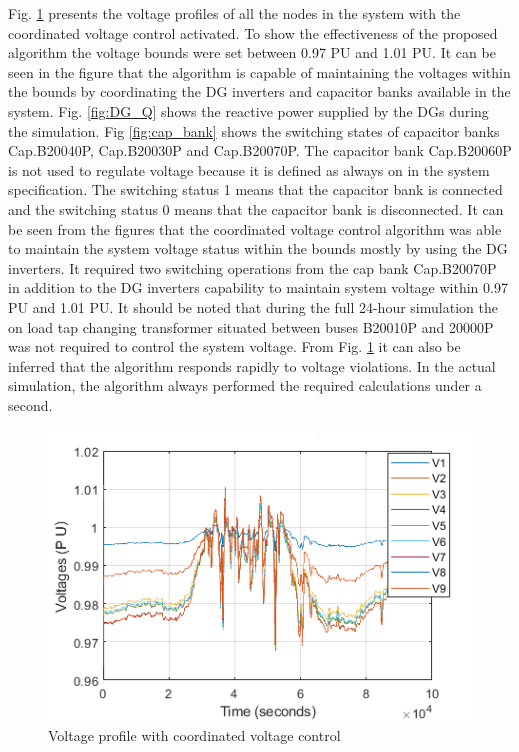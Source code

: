 Fig. \ref{fig:with_cvc} presents the voltage profiles of all the nodes in the system with the coordinated voltage control activated. To show the effectiveness of the proposed algorithm the voltage bounds were set between 0.97 PU and 1.01 PU. It can be seen in the figure that the algorithm is capable of maintaining the voltages within the bounds by coordinating the DG inverters and capacitor banks available in the system. Fig. \ref{fig:DG_Q} shows the reactive power supplied by the DGs during the simulation. Fig \ref{fig:cap_bank} shows the switching states of capacitor banks Cap.B20040P, Cap.B20030P and Cap.B20070P. The capacitor bank Cap.B20060P is not used to regulate voltage because it is defined as always on in the system specification. The switching status 1 means that the capacitor bank is connected and the switching status 0 means that the capacitor bank is disconnected. It can be seen from the figures that the coordinated voltage control algorithm was able to maintain the system voltage status within the bounds mostly by using the DG inverters. It required two switching operations from the cap bank Cap.B20070P in addition to the DG inverters capability to maintain system voltage within 0.97 PU and 1.01 PU. It should be noted that during the full 24-hour simulation the on load tap changing transformer situated between buses B20010P and 20000P was not required to control the system voltage. From Fig. \ref{fig:with_cvc} it can also be inferred that the algorithm responds rapidly to voltage violations. In the actual simulation, the algorithm always performed the required calculations under a second.

\begin{figure}[!h]
\centering
\includegraphics[width=\linewidth]{figs/CVC/With_VVC.png}
\caption{Voltage profile with coordinated voltage control}
\label{fig:with_cvc}
\end{figure}

